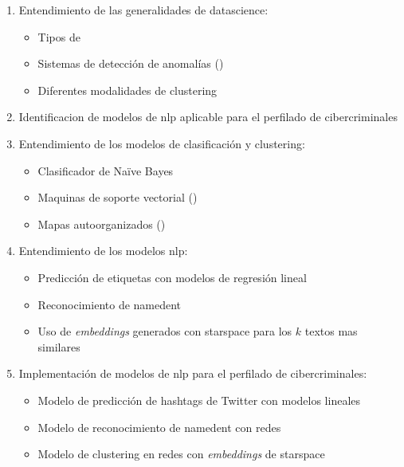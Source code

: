 \begin{enumerate}
\item Entendimiento de las generalidades de \gls{datascience}:
  \begin{itemize}
  \item Tipos de 
  \item Sistemas de detección de anomalías ()
  \item Diferentes modalidades de \gls{clustering}
  \end{itemize}
\item Identificacion de modelos de \gls{nlp} aplicable para el perfilado de cibercriminales
\item Entendimiento de los modelos de clasificación y \gls{clustering}:
  \begin{itemize}
  \item Clasificador de Na\"ive Bayes
  \item Maquinas de soporte vectorial ()
  \item Mapas autoorganizados ()
  \end{itemize}
\item Entendimiento de los modelos \gls{nlp}:
  \begin{itemize}
  \item Predicción de etiquetas con modelos de regresión lineal
  \item Reconocimiento de \gls{namedent}
  \item Uso de \emph{embeddings} generados con \gls{starspace} para los $k$ textos mas similares
  \end{itemize}
\item Implementación de modelos de \gls{nlp} para el perfilado de cibercriminales:
  \begin{itemize}
  \item Modelo de predicción de hashtags de Twitter con modelos lineales 
  \item Modelo de reconocimiento de \gls{namedent} con redes  
  \item Modelo de \gls{clustering} en redes  con \emph{embeddings} de \gls{starspace} 
  \end{itemize}
\end{enumerate}
